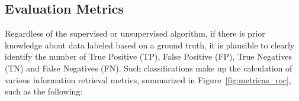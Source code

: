 \documentclass{ieeeaccess}
\begin{document}
\subsection{Evaluation Metrics}
\label{subsec:metricasdeavaliação}


Regardless of the supervised or unsupervised algorithm, if there is prior knowledge about data labeled based on a ground truth, it is plausible to clearly identify the number of True Positive (TP), False Positive (FP), True Negatives (TN) and False Negatives (FN). Such classifications make up the calculation of various information retrieval metrics, summarized in Figure~\ref{fig:metricas_roc}, such as the following:

\end{document}
